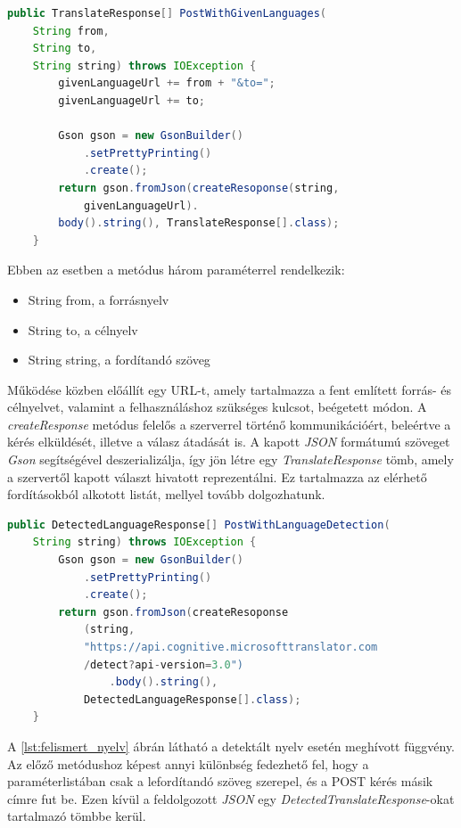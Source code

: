 \begin{lstlisting}[language=java, label={lst:adott_nyelv}]
public TranslateResponse[] PostWithGivenLanguages(
    String from,
    String to,
    String string) throws IOException {
        givenLanguageUrl += from + "&to=";
        givenLanguageUrl += to;

        Gson gson = new GsonBuilder()
            .setPrettyPrinting()
            .create();
        return gson.fromJson(createResoponse(string,
            givenLanguageUrl).
        body().string(), TranslateResponse[].class);
    }
\end{lstlisting}
Ebben az esetben a metódus három paraméterrel rendelkezik:
\begin{itemize}[noitemsep]
\item String from, a forrásnyelv
\item String to, a célnyelv
\item String string, a fordítandó szöveg
\end{itemize}
Működése közben előállít egy URL-t, amely tartalmazza a fent említett forrás- és célnyelvet, valamint a felhasználáshoz szükséges kulcsot, beégetett módon. A \textit{createResponse} metódus felelős a szerverrel történő kommunikációért, beleértve a kérés elküldését, illetve a válasz átadását is. A kapott \textit{JSON} formátumú szöveget \textit{Gson} segítségével deszerializálja, így jön létre egy \textit{TranslateResponse} tömb, amely a szervertől kapott választ hivatott reprezentálni. Ez tartalmazza az elérhető fordításokból alkotott listát, mellyel tovább dolgozhatunk.

\begin{lstlisting}[language=java, label={lst:felismert_nyelv}]
public DetectedLanguageResponse[] PostWithLanguageDetection(
    String string) throws IOException {
        Gson gson = new GsonBuilder()
            .setPrettyPrinting()
            .create();
        return gson.fromJson(createResoponse
            (string,
            "https://api.cognitive.microsofttranslator.com
            /detect?api-version=3.0")
                .body().string(),
            DetectedLanguageResponse[].class);
    }
\end{lstlisting}
A \ref{lst:felismert_nyelv} ábrán látható a detektált nyelv esetén meghívott függvény. Az előző metódushoz képest annyi különbség fedezhető fel, hogy a paraméterlistában csak a lefordítandó szöveg szerepel, és a POST kérés másik címre fut be. Ezen kívül a feldolgozott \textit{JSON} egy \textit{DetectedTranslateResponse}-okat tartalmazó tömbbe kerül. 

